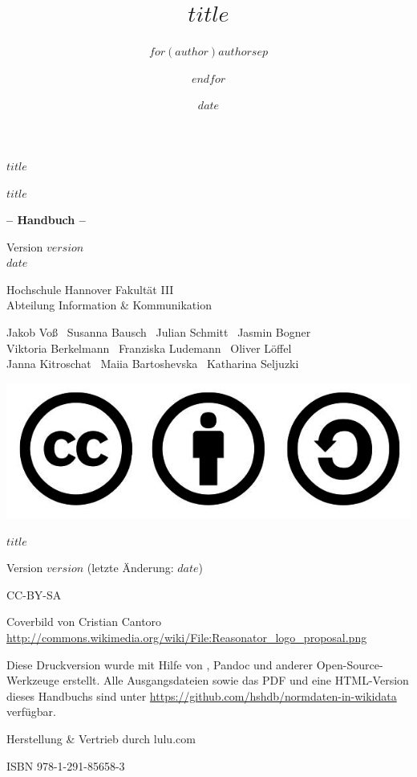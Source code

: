 \documentclass[
    a5paper,pagesize,
    10pt,
    DIV=12, %
    BCOR=2mm,
    open=any, %
    ngerman
]{scrbook}
\title{$title$}
\author{$for(author)$$author$$sep$ \and $endfor$}
\date{$date$}
\makeatletter
\def\maxwidth{\ifdim\Gin@nat@width>\linewidth\linewidth
\else\Gin@nat@width\fi}
\let\Oldincludegraphics\includegraphics
\renewcommand{\includegraphics}[1]{\Oldincludegraphics[width=\maxwidth]{#1}}
\makeatother
\begin{document}
\thispagestyle{empty}
\begin{center}
\bfseries\sffamily\Large
\vspace{2cm}
$title$
\end{center}

\cleardoublepage

\thispagestyle{empty}
\begin{center}
\sffamily
\vspace{2cm}
{
  {\huge $title$}
  \vspace{0.5cm}
  
  {\bfseries\LARGE -- Handbuch -- }
  \vspace{0.5cm}

  Version $version$\\$date$
}
\vfill
{
  \large
  Hochschule Hannover Fakultät III\\
  Abteilung Information \& Kommunikation
}

Jakob Voß \textbar\ Susanna Bausch \textbar\ Julian Schmitt \textbar\ Jasmin Bogner \\
Viktoria Berkelmann \textbar\ Franziska Ludemann \textbar\ Oliver Löffel \\
Janna Kitroschat \textbar\ Maiia Bartoshevska \textbar\ Katharina Seljuzki

\includegraphics{images/cc-by-sa.png}

\end{center}

\pagebreak
\thispagestyle{empty}
\vspace*{\fill}
{
$title$

Version $version$ (letzte Änderung: $date$)

CC-BY-SA

Coverbild von Cristian Cantoro
\url{http://commons.wikimedia.org/wiki/File:Reasonator_logo_proposal.png}

Diese Druckversion wurde mit Hilfe von \XeTeX, Pandoc und anderer
Open-Source-Werkzeuge erstellt. Alle Ausgangsdateien sowie das PDF 
und eine HTML-Version dieses Handbuchs sind unter
\url{https://github.com/hshdb/normdaten-in-wikidata} verfügbar.

Herstellung \& Vertrieb durch lulu.com

ISBN 978-1-291-85658-3
}
\end{document}
